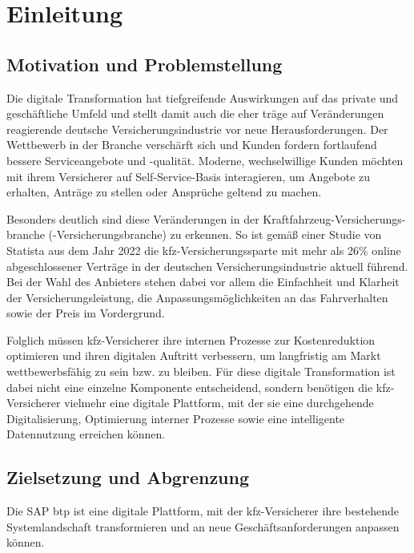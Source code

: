 \chapter{Einleitung}

\section{Motivation und Problemstellung}

Die digitale Transformation hat tiefgreifende Auswirkungen auf das private und geschäftliche Umfeld und stellt damit auch die eher träge auf Veränderungen reagierende deutsche Versicherungsindustrie vor neue Herausforderungen. Der Wettbewerb in der Branche verschärft sich und Kunden fordern fortlaufend bessere Serviceangebote und -qualität. Moderne, wechselwillige Kunden möchten mit ihrem Versicherer auf Self-Service-Basis interagieren, um Angebote zu erhalten, Anträge zu stellen oder Ansprüche geltend zu machen. \autocite[Vgl.][]{SCHMIDT2022}

Besonders deutlich sind diese Veränderungen in der Kraftfahrzeug-Versicherungs-branche (-Versicherungsbranche) zu erkennen. So ist gemäß einer Studie von Statista aus dem Jahr 2022 die \ac{kfz}-Versicherungssparte mit mehr als 26\% online abgeschlossener Verträge in der deutschen Versicherungsindustrie aktuell führend. \autocite[Vgl.][]{STATISTA2023} Bei der Wahl des Anbieters stehen dabei vor allem die Einfachheit und Klarheit der Versicherungsleistung, die Anpassungsmöglichkeiten an das Fahrverhalten sowie der Preis im Vordergrund. \autocite[Vgl.][]{MITZNER2023} 

Folglich müssen \ac{kfz}-Versicherer ihre internen Prozesse zur Kostenreduktion optimieren und ihren digitalen Auftritt verbessern, um langfristig am Markt wettbewerbsfähig zu sein bzw. zu bleiben. Für diese digitale Transformation ist dabei nicht eine einzelne Komponente entscheidend, sondern benötigen die \ac{kfz}-Versicherer vielmehr eine digitale Plattform, mit der sie eine durchgehende Digitalisierung, Optimierung interner Prozesse sowie eine intelligente Datennutzung erreichen können. \autocite[Vgl.][]{WEINGARTNER2023} 

\section{Zielsetzung und Abgrenzung}

Die SAP \ac{btp} ist eine digitale Plattform, mit der \ac{kfz}-Versicherer ihre bestehende Systemlandschaft transformieren und an neue Geschäftsanforderungen anpassen können.

